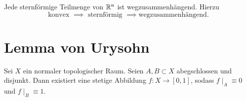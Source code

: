 \begin{remark}
    Jede sternförmige Teilmenge von $\mathbb{R}^n$ ist wegzusammenhängend. Hierzu
    \[
    \text{konvex } \implies \text{ sternförmig } \implies \text{wegzusammenhängend}
    .\] 
\end{remark}


\section{Lemma von Urysohn}

\begin{theorem}\label{thm:urysohn}
    Sei $X$ ein normaler topologischer Raum. Seien  $A,B\subset X$ abegschlossen und disjunkt. Dann existiert eine stetige Abbildung $f: X \to  [0,1]$, sodass $f\mid _A \equiv 0 $ und $f\mid _{B} \equiv  1$.
\end{theorem}

